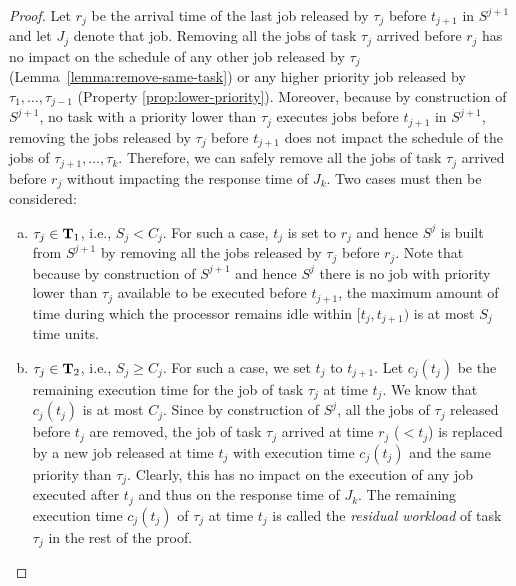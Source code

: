 \begin{proof}
Let $r_j$ be the arrival time of the last job released by $\tau_j$ before $t_{j+1}$ in $S^{j+1}$ and let $J_{j}$ denote that job. %
Removing all the jobs of task $\tau_j$ arrived before $r_j$ has no impact on the schedule of any other job released by $\tau_j$ (Lemma~\ref{lemma:remove-same-task}) or any higher priority job released by $\tau_1, \ldots, \tau_{j-1}$ (Property \ref{prop:lower-priority}). Moreover, because by construction of $S^{j+1}$, no task with a priority lower than $\tau_j$ executes jobs before $t_{j+1}$ in $S^{j+1}$, removing the jobs released by $\tau_j$ before $t_{j+1}$ does not impact the schedule of the jobs of $\tau_{j+1}, \ldots, \tau_{k}$. Therefore, we can safely remove all the jobs of task $\tau_j$ arrived before $r_j$ without impacting the response time of $J_{k}$. Two cases must then be considered:
\begin{enumerate}[(a)]
\item $\tau_j \in {\bf T}_1$, i.e., $S_j < C_j$. For such a case, $t_{j}$ is set to $r_j$ and hence $S^j$ is built from $S^{j+1}$ by removing all the jobs released by $\tau_j$ before $r_j$. Note that because by construction of $S^{j+1}$ and hence $S^j$ there is no job with priority lower than $\tau_j$ available to be executed before $t_{j+1}$, the maximum amount of time during which the processor remains idle within $[t_j, t_{j+1})$ is at most $S_j$ time units.
\item $\tau_j \in {\bf T}_2$, i.e., $S_j \geq C_j$. For such a case, we set $t_{j}$ to $t_{j+1}$. Let $c_j(t_j)$ be the remaining execution time for the job of task $\tau_j$ at time $t_j$. We know that $c_j(t_j)$ is at most $C_j$. Since by construction of $S^j$, all the jobs of $\tau_j$ released before $t_j$ are removed, the job of task $\tau_j$ arrived at time $r_j$ ($< t_j$) is replaced by a new job released at time $t_j$ with execution time $c_j(t_j)$ and the same priority than $\tau_j$. Clearly, this has no impact on the execution of any job executed after $t_j$ and thus on the response time of $J_k$. The remaining execution time $c_j(t_j)$ of $\tau_j$ at time $t_j$ is called the \emph{residual workload} of task $\tau_j$ in the rest of the proof.

\end{enumerate}
\end{proof}
